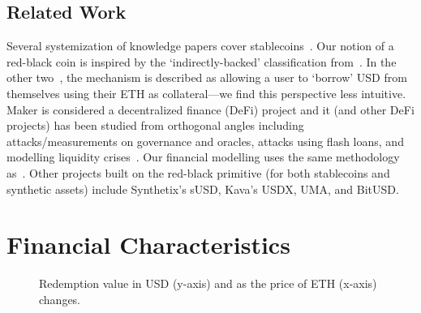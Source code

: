 \subsection{Related Work} Several systemization of knowledge papers cover stablecoins~\cite{PHP+19,MSS20,CDM20}. Our notion of a red-black coin is inspired by the `indirectly-backed' classification from~\cite{CDM20}. In the other two~\cite{PHP+19,MSS20}, the mechanism is described as allowing a user to `borrow' USD from themselves using their ETH as collateral---we find this perspective less intuitive. Maker is considered a decentralized finance (DeFi) project and it (and other DeFi projects) has been studied from orthogonal angles including attacks/measurements on governance and oracles, attacks using flash loans, and modelling liquidity crises~\cite{GRB20,GPH+20,QZLG20,KMM20}. Our financial modelling uses the same methodology as~\cite{GPH+20}. Other projects built on the red-black primitive (for both stablecoins and synthetic assets) include Synthetix's sUSD, Kava's USDX, UMA, and BitUSD. 


\section{Financial Characteristics}


\begin{figure}[t]
    \centering
        \qquad
    \caption{Redemption value in USD (y-axis) and as the price of ETH (x-axis) changes. \label{fig:price1} \label{fig:price2}}
\end{figure}

